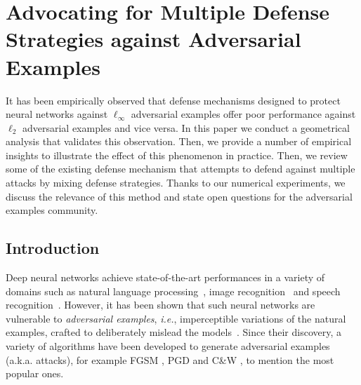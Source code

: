 



\newcommand{\todo}[2]{{\color{red}{\bf TODO (#1):} #2}}
\newcommand{\todoben}[1]{\todo{ben}{#1}}
\newcommand{\todoalex}[1]{\todo{alex}{#1}}
\newcommand{\todolau}[1]{\todo{lau}{#1}}
\newcommand{\todoraf}[1]{\todo{raf}{#1}}


\newtheorem{method}{Attack}
\newcommand{\E}{\mathbb{E}}




\chapter{Advocating for Multiple Defense Strategies against Adversarial Examples}
\label{paper:ecml_rat}

It has been empirically observed that defense mechanisms designed to protect neural networks against $\ell_\infty$ adversarial examples offer poor performance against $\ell_2$ adversarial examples and vice versa. In this paper we conduct a geometrical analysis that validates this observation. Then, we provide a number of empirical insights to illustrate the effect of this phenomenon in practice. 
Then, we review some of the existing defense mechanism that attempts to defend against multiple attacks by mixing defense strategies. Thanks to our numerical experiments, we discuss the relevance of this method and state open questions for the adversarial examples community.



\section{Introduction}
\label{intro}
Deep neural networks achieve state-of-the-art performances in a variety of domains such as natural language processing~\cite{radford2018Language}, image recognition~\cite{he2016deep} and speech
recognition~\cite{hinton2012deep}. However, it has been shown that such neural networks are vulnerable to {\em adversarial examples}, \emph{i.e.}, imperceptible variations of the natural examples, crafted to deliberately mislead the models~\cite{globerson2006nightmare,biggio2013evasion,Szegedy2013IntriguingPO}. Since their discovery, a variety of algorithms have been developed to generate adversarial examples (a.k.a. attacks), for example FGSM \citep{goodfellow2014explaining}, PGD \citep{madry2018towards} and C\&W \citep{carlini2017towards}, to mention the most popular ones.

